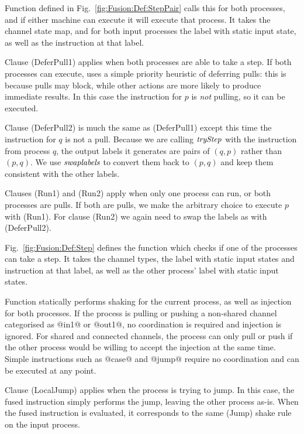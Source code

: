 

Function  defined in Fig.~\ref{fig:Fusion:Def:StepPair} calls this for both processes, and if either machine can execute it will execute that process.
It takes the channel state map, and for both input processes the label with static input state, as well as the instruction at that label.

Clause (DeferPull1) applies when both processes are able to take a step.
If both processes can execute,  uses a simple priority heuristic of deferring pulls: this is because pulls may block, while other actions are more likely to produce immediate results.
In this case the instruction for $p$ is \emph{not} pulling, so it can be executed.

Clause (DeferPull2) is much the same as (DeferPull1) except this time the instruction for $q$ is not a pull.
Because we are calling $\textit{tryStep}$ with the instruction from process $q$, the output labels it generates are pairs of $(q,p)$ rather than $(p,q)$.
We use $\textit{swaplabels}$ to convert them back to $(p,q)$ and keep them consistent with the other labels.

Clauses (Run1) and (Run2) apply when only one process can run, or both processes are pulls.
If both are pulls, we make the arbitrary choice to execute $p$ with (Run1).
For clause (Run2) we again need to swap the labels as with (DeferPull2).



Fig.~\ref{fig:Fusion:Def:Step} defines the  function which checks if one of the processes can take a step.
It takes the channel types, the label with static input states and instruction at that label, as well as the other process' label with static input states.

Function  statically performs shaking for the current process, as well as injection for both processes.
If the process is pulling or pushing a non-shared channel categorised as @in1@ or @out1@, no coordination is required and injection is ignored.
For shared and connected channels, the process can only pull or push if the other process would be willing to accept the injection at the same time.
Simple instructions such as @case@ and @jump@ require no coordination and can be executed at any point.

Clause (LocalJump) applies when the process is trying to jump.
In this case, the fused instruction simply performs the jump, leaving the other process as-is.
When the fused instruction is evaluated, it corresponds to the same (Jump) shake rule on the input process.

